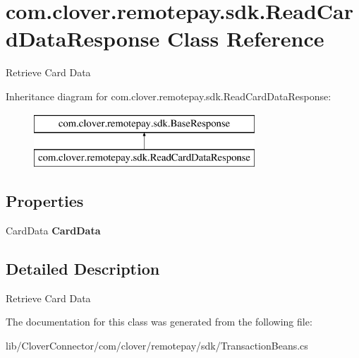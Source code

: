 \hypertarget{classcom_1_1clover_1_1remotepay_1_1sdk_1_1_read_card_data_response}{}\section{com.\+clover.\+remotepay.\+sdk.\+Read\+Card\+Data\+Response Class Reference}
\label{classcom_1_1clover_1_1remotepay_1_1sdk_1_1_read_card_data_response}


Retrieve Card Data  


Inheritance diagram for com.\+clover.\+remotepay.\+sdk.\+Read\+Card\+Data\+Response\+:\begin{figure}[H]
\begin{center}
\leavevmode
\includegraphics[height=2.000000cm]{classcom_1_1clover_1_1remotepay_1_1sdk_1_1_read_card_data_response}
\end{center}
\end{figure}
\subsection*{Properties}
\begin{DoxyCompactItemize}
\item 
\mbox{\label{classcom_1_1clover_1_1remotepay_1_1sdk_1_1_read_card_data_response_a1b463be5653f0a2c5f3744cbf9563c9c}} 
Card\+Data {\bfseries Card\+Data}
\end{DoxyCompactItemize}


\subsection{Detailed Description}
Retrieve Card Data 



The documentation for this class was generated from the following file\+:\begin{DoxyCompactItemize}
\item 
lib/\+Clover\+Connector/com/clover/remotepay/sdk/Transaction\+Beans.\+cs\end{DoxyCompactItemize}
